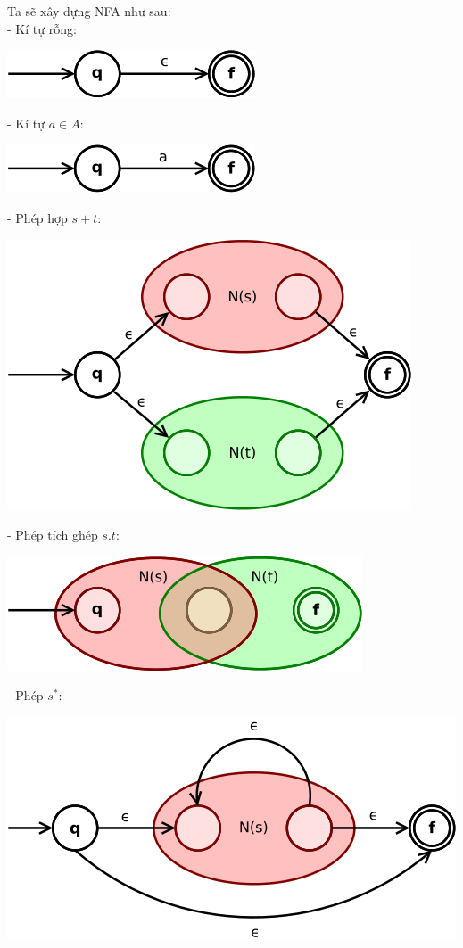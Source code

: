 \documentclass[12pt,a4paper]{article}
\begin{document}
Ta sẽ xây dựng NFA như sau:\\
- Kí tự rỗng:
\begin{center}
\includegraphics[scale=0.7]{empty.png}
\end{center}
- Kí tự $a \in A$:
\begin{center}
\includegraphics[scale=0.7]{symbol.png}
\end{center}
- Phép hợp $s+t$:
\begin{center}
\includegraphics[scale=0.6]{union.png}
\end{center}
- Phép tích ghép $s.t$:
\begin{center}
\includegraphics[scale=0.6]{concac.png}
\end{center}
- Phép $s^*$:
\begin{center}
\includegraphics[scale=0.6]{star.png}
\end{center}
\end{document}
